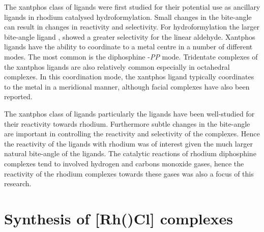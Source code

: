 
The xantphos class of ligands were first studied for their potential use as ancillary ligands in rhodium catalysed hydroformylation\cite{Kranenburg1995}.  Small changes in the bite-angle can result in changes in reactivity and selectivity.  For hydroformylation the larger bite-angle ligand ,\Phxantphos{} showed a greater selectivity for the linear aldehyde.  Xantphos ligands have the ability to coordinate to a metal centre in a number of different modes.  The most common is the diphosphine -\emph{PP\textprime} mode.  Tridentate \POP{} complexes of the xantphos ligands are also relatively common especially in octahedral complexes.  In this \POP{} coordination mode, the xantphos ligand typically coordinates to the metal in a meridional manner, although facial complexes have also been reported.\cite{Dallanegra2012, Pawley2012}  

The xantphos class of ligands particularly the \Phxantphos{} ligands have been well-studied for their reactivity towards rhodium.  Furthermore subtle changes in the bite-angle are important in controlling the reactivity and selectivity of the complexes.  Hence the reactivity of the \tBuxantphos{} ligands with rhodium was of interest given the much larger natural bite-angle of the ligands.  The catalytic reactions of rhodium diphosphine complexes tend to involved hydrogen and carbons monoxide gases, hence the reactivity of the rhodium \tBuxantphos{} complexes towards these gases was also a focus of this research.  

\section{Synthesis of [Rh(\POP)Cl] complexes}
\label{section:rhodiumchloride}


